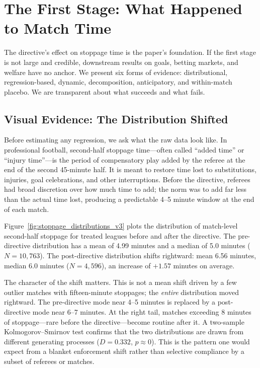 
\section{The First Stage: What Happened to Match Time}
\label{sec:firststage}

The directive's effect on stoppage time is the paper's foundation. If the first stage is not large and credible, downstream results on goals, betting markets, and welfare have no anchor. We present six forms of evidence: distributional, regression-based, dynamic, decomposition, anticipatory, and within-match placebo. We are transparent about what succeeds and what fails.


\subsection{Visual Evidence: The Distribution Shifted}
\label{subsec:visual}

Before estimating any regression, we ask what the raw data look like. In professional football, second-half stoppage time---often called ``added time'' or ``injury time''---is the period of compensatory play added by the referee at the end of the second 45-minute half. It is meant to restore time lost to substitutions, injuries, goal celebrations, and other interruptions. Before the directive, referees had broad discretion over how much time to add; the norm was to add far less than the actual time lost, producing a predictable 4--5 minute window at the end of each match.

Figure~\ref{fig:stoppage_distributions_v3} plots the distribution of match-level second-half stoppage for treated leagues before and after the directive. The pre-directive distribution has a mean of 4.99 minutes and a median of 5.0 minutes ($N = 10{,}763$). The post-directive distribution shifts rightward: mean 6.56 minutes, median 6.0 minutes ($N = 4{,}596$), an increase of $+1.57$ minutes on average.

The character of the shift matters. This is not a mean shift driven by a few outlier matches with fifteen-minute stoppages; the \textit{entire} distribution moved rightward. The pre-directive mode near 4--5 minutes is replaced by a post-directive mode near 6--7 minutes. At the right tail, matches exceeding 8 minutes of stoppage---rare before the directive---become routine after it. A two-sample Kolmogorov--Smirnov test confirms that the two distributions are drawn from different generating processes ($D = 0.332$, $p \approx 0$). This is the pattern one would expect from a blanket enforcement shift rather than selective compliance by a subset of referees or matches.

